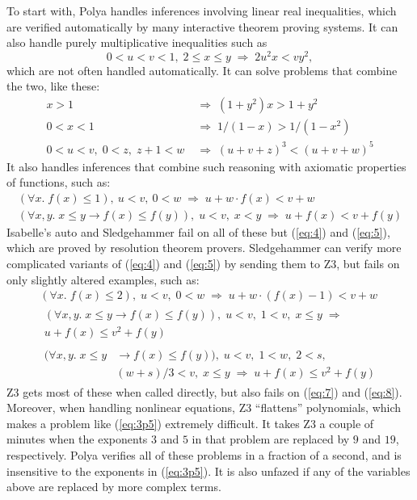 \documentclass[runningheds]{llncs}
\newcommand{\myRightarrow}{\; \Rightarrow \;}
\begin{document}
To start with, Polya handles inferences involving linear real inequalities, which are verified automatically by many interactive theorem proving systems. It can also handle purely multiplicative inequalities such as
\begin{equation}
\label{eq:1}
 0 < u < v < 1, \; 2 \leq x \leq y \myRightarrow 2 u^2 x < v y^2,
\end{equation}
which are not often handled automatically. It can solve problems that combine the two, like these:
\begin{align}
\label{eq:2}
x > 1 & \myRightarrow (1 + y^2) x > 1 + y^2 \\
\label{eq:3}
0 < x < 1 & \myRightarrow 1 / (1 - x) > 1 / (1 - x^2) \\
\label{eq:3p5}
0 < u < v, \; 0 < z, \; z + 1 < w & \myRightarrow (u + v + z)^3 < (u + v + w)^5
\end{align}
It also handles inferences that combine such reasoning with axiomatic properties of functions, such as: 
\begin{gather}
\label{eq:4}
(\forall x. \; f(x) \leq 1),\ u < v,\ 0 < w \myRightarrow u + w \cdot f(x) < v + w
\\
\label{eq:5}
(\forall x, y. \; x \leq y \rightarrow f(x) \leq f(y)), \; u < v, \; x < y \myRightarrow u + f(x) < v + f(y) 
\end{gather} 
Isabelle's auto and Sledgehammer fail on all of these but (\ref{eq:4}) and (\ref{eq:5}), which are proved by resolution theorem provers. Sledgehammer can verify more complicated variants of (\ref{eq:4}) and (\ref{eq:5}) by sending them to Z3, but fails on only slightly altered examples, such as:
\begin{gather}
\label{eq:6}
(\forall x. \; f(x) \leq 2), \; u < v, \; 0 < w \myRightarrow u + w \cdot (f(x) - 1) < v + w
\\
\label{eq:7}
\begin{split}
(\forall x, y. \; x \leq y \rightarrow f(x) \leq f(y)), \; u < v, \;
1 < v, \; x \leq y \myRightarrow \\
u + f(x) \leq v^2 + f(y)
\end{split}
\\
\label{eq:8}
\begin{split}
(\forall x, y. \; x \leq y & \rightarrow f(x) \leq f(y)), \; u < v,  \; 1 < w, \; 2 < s,\\
& (w + s) / 3 < v, \; x \leq y \myRightarrow u + f(x) \leq v^2 + f(y)
\end{split} 
\end{gather}
Z3 gets most of these when called directly, but also fails on (\ref{eq:7}) and (\ref{eq:8}). Moreover, when handling nonlinear equations, Z3 ``flattens'' polynomials, which makes a problem like (\ref{eq:3p5}) extremely difficult. It takes Z3 a couple of minutes when the exponents $3$ and $5$ in that problem are replaced by $9$ and $19$, respectively. Polya verifies all of these problems in a fraction of a second, and is insensitive to the exponents in (\ref{eq:3p5}). It is also unfazed if any of the variables above are replaced by more complex terms.
\end{document}
